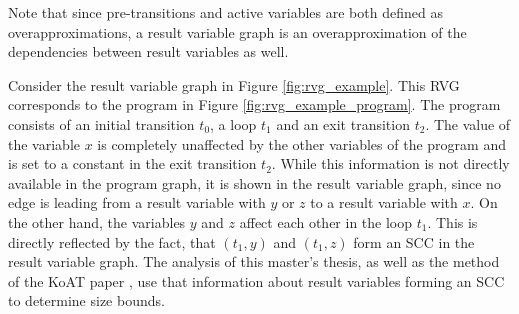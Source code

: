 Note that since pre-transitions and active variables are both defined as overapproximations, a result variable graph is an overapproximation of the dependencies between result variables as well.



Consider the result variable graph in Figure \ref{fig:rvg_example}.
This RVG corresponds to the program in Figure \ref{fig:rvg_example_program}.
The program consists of an initial transition $t_0$, a loop $t_1$ and an exit transition $t_2$.
The value of the variable $x$ is completely unaffected by the other variables of the program and is set to a constant in the exit transition $t_2$.
While this information is not directly available in the program graph, it is shown in the result variable graph, since no edge is leading from a result variable with $y$ or $z$ to a result variable with $x$.
On the other hand, the variables $y$ and $z$ affect each other in the loop $t_1$.
This is directly reflected by the fact, that $(t_1,y)$ and $(t_1,z)$ form an SCC in the result variable graph.
The analysis of this master's thesis, as well as the method of the KoAT paper \cite{koat}, use that information about result variables forming an SCC to determine size bounds.
